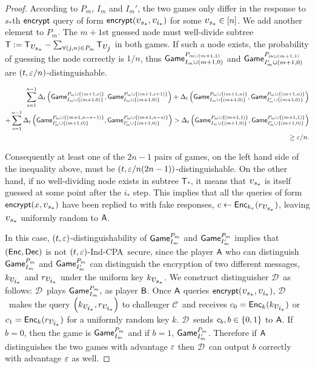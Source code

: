 \documentclass{article}
\newcommand{\tcpa}{$(t,\eps)$-Ind-CPA}
\def\B{{\sf B}}
\def\A{{\sf A}}
\def\a {${\mathcal D}$}
\def\ch {${\mathcal C}$}
\newcommand{\encrypt}{{\sf encrypt}}
\newcommand{\game}{{\sf Game}}
\newcommand{\T}{{\mathsf T}}
\newcommand{\dgg}[2]{\game_{#1}^{#2}}
\newcommand{\bigv}[1]{\mbox{\large $v_{#1}$}}
\begin{document}
\begin{proof}
According to $P_m$, $I_m$ and $I_m'$, the two games only differ in the response to $s_*$th $\encrypt$ query of form $\encrypt(\bigv{s_*},\bigv{i_*})$ for some $\bigv{s_*}\in[n]$. We add another element to $P_{m}$. The $m+1$st guessed node must well-divide subtree $\T:=\T_{\bigv{s_*}}- \sum_{\forall (j,n)\in P_m}\T_{\bigv{j}}$ in both games. If such a node exists, the probability of guessing the node correctly is $1/n$, thus $\dgg{I_m\cup (m+1,0)}{P_{m\cup(m+1,1)}}$ and $\dgg{I'_m\cup (m+1,0) }{P_{m\cup(m+1,1)}}$ are $(t,\varepsilon/n)$-distinguishable.


\begin{align*}
\sum_{s=1}^{n-1} \dElta{\dgg{I_m\cup\cub{ (m+1,0)}}{P_m\cup \cub{(m+1, s)}},\dgg{I_m\cup\cub{ (m+1,0)}}{P_m\cup \cub{(m+1, s+1)}}}+ \dElta{\dgg{I_m\cup\cub{ (m+1,0)}}{P_m\cup \cub{(m+1, n)}},\dgg{I'_m\cup \cub{(m+1,0)}}{P_m\cup \cub{(m+1, n)}}} \\+ \sum_{s=1}^{n-1} \dElta{\dgg{I'_m\cup \cub{(m+1,0)}}{P_m\cup \cub{(m+1, n-s-1)}},\dgg{I'_m\cup\cub{ (m+1,0)}}{P_m\cup \cub{(m+1, n-s)}}}
> \dElta{\dgg{I_m\cup \cub{(m+1,0)}}{P_{m}\cup \cub{(m+1,1)}},\dgg{I'_m\cup\cub{ (m+1,0) }}{P_{m}\cup \cub{(m+1,1)}}}\\ \geq \eps/n.
\end{align*}

Consequently at least one of the $2n-1$ pairs of games, on the left hand side of the inequality above, must be $(t,\varepsilon/n(2n-1))$-distinguishable. On the other hand, if no well-dividing node exists in subtree $\T_*$, it means that $\bigv{s_*}$ is itself guessed at some point after the $i_*$ step. This implies that all the queries of form $\encrypt(x,\bigv{s_*})$ have been replied to with fake responses, $c\leftarrow \Enc_{k_x}(r_{\bigv{s_*}})$, leaving $\bigv{s_*}$ uniformly random to $\A$. 

In this case, $(t,\varepsilon)$-distinguishability of $\dgg{I_m}{P_m}$ and $\dgg{I'_m}{P_m}$ implies that $({\sf Enc},{\sf Dec})$ is not \tcpa~secure, since the player $\A$ who can distinguish $\dgg{I_m}{P_m}$ and $\dgg{I'_m}{P_m}$ can distinguish the encryption of two different messages, $k_{\bigv{i_*}}$ and $r_{\bigv{i_*}}$ under the uniform key $k_{\bigv{s_*}}$. 
We construct distinguisher \a~as follows: \a~plays $\dgg{I_m}{P_m},$ as player $\B$. Once $\A$ queries $\encrypt(\bigv{s_*},\bigv{i_*})$, \a~makes the query $\rob{k_{\bigv{i_*}},r_{\bigv{i_*}}}$ to challenger \ch~and receives $c_0= \Enc_k(k_{\bigv{i_*}})$ or $c_1= \Enc_k(r_{\bigv{i_*}})$ for a uniformly random key $k$. \a~sends $c_b, b\in\{0,1\}$ to $\A$. If $b=0$, then the game is $\dgg{I_m}{P_m}$ and if $b=1$, $\dgg{I'_m}{P_m}$. Therefore if $\A$ distinguishes the two games with advantage $\varepsilon$ then \a~can output $b$ correctly with advantage $\varepsilon$ as well.


\end{proof}
\end{document}
